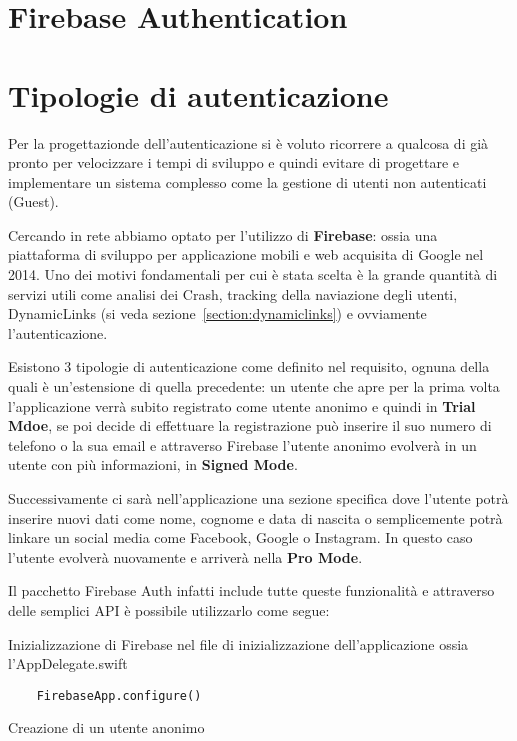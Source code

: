 \section{Firebase Authentication}

\section{Tipologie di autenticazione}

Per la progettazionde dell'autenticazione si è voluto ricorrere a qualcosa di 
già pronto per velocizzare i tempi di sviluppo e quindi evitare di progettare e implementare un sistema 
complesso come la gestione di utenti non autenticati (Guest).

Cercando in rete abbiamo optato per l'utilizzo di \textbf{Firebase}\cite{firebase}: ossia una piattaforma
di sviluppo per applicazione mobili e web acquisita di Google nel 2014. 
Uno dei motivi fondamentali per cui è stata scelta è la grande quantità di servizi utili come
analisi dei Crash, tracking della naviazione degli utenti, DynamicLinks (si veda sezione~\ref{section:dynamiclinks})
e ovviamente l'autenticazione.

Esistono 3 tipologie di autenticazione come definito nel requisito, ognuna della quali è un'estensione
di quella precedente: un utente che apre per la prima volta l'applicazione verrà subito registrato 
come utente anonimo e quindi in \textbf{Trial Mdoe}, se poi decide di effettuare la registrazione può inserire 
il suo numero di telefono o la sua email e attraverso Firebase l'utente anonimo evolverà in un utente con più
informazioni, in \textbf{Signed Mode}.

Successivamente ci sarà nell'applicazione una sezione specifica dove l'utente potrà inserire nuovi dati come nome, cognome e data di nascita
o semplicemente potrà linkare un social media come Facebook, Google o Instagram. In questo caso l'utente evolverà nuovamente 
e arriverà nella \textbf{Pro Mode}.

Il pacchetto Firebase Auth infatti include tutte queste funzionalità e attraverso delle semplici API
è possibile utilizzarlo come segue:

Inizializzazione di Firebase nel file di inizializzazione dell'applicazione ossia l'AppDelegate.swift

\begin{verbatim}
    FirebaseApp.configure()
\end{verbatim}

Creazione di un utente anonimo

